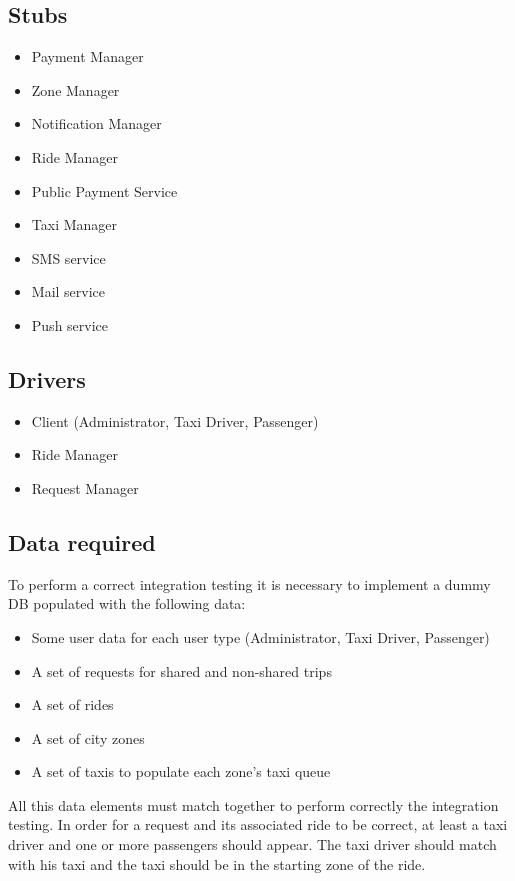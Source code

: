 \documentclass[a4paper,11pt]{report} %
\begin{document}
		\subsection{Stubs}
			\begin{itemize}
				\item Payment Manager
				\item Zone Manager
				\item Notification Manager
				\item Ride Manager
				\item Public Payment Service
				\item Taxi Manager
				\item SMS service
				\item Mail service
				\item Push service
			\end{itemize}
		\subsection{Drivers}
			\begin{itemize}
				\item Client (Administrator, Taxi Driver, Passenger)
				\item Ride Manager
				\item Request Manager
			\end{itemize}
		\subsection{Data required} \label{sec:5.3}
			To perform a correct integration testing it is necessary to implement a dummy DB populated with the following data:
			\begin{itemize}
				\item Some user data for each user type (Administrator, Taxi Driver, Passenger)
				\item A set of requests for shared and non-shared trips
				\item A set of rides
				\item A set of city zones
				\item A set of taxis to populate each zone’s taxi queue
			\end{itemize}
			All this data elements must match together to perform correctly the integration testing. In order for a request and its associated ride to be correct, at least a taxi driver and one or more passengers should appear. The taxi driver should match with his taxi and the taxi should be in the starting zone of the ride.
	
\end{document}
